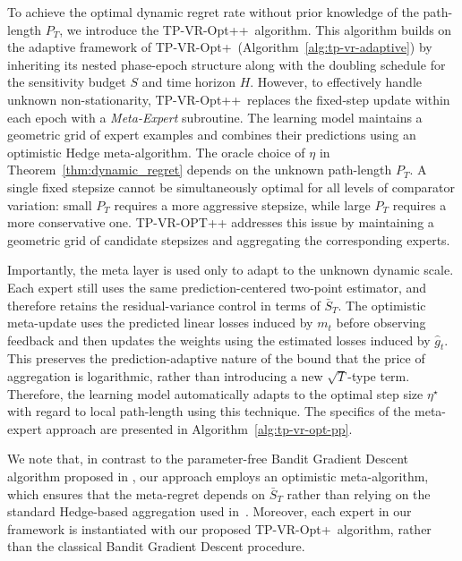 \documentclass[journal,onecolumn]{IEEEtran}
\theoremstyle{plain}
\theoremstyle{definition}
\theoremstyle{remark}
\newcommand{\tpvrplus}{{\sc TP-VR-Opt+}}
\newcommand{\tpvrplusplus}{{\sc TP-VR-Opt++}}
\begin{document}
To achieve the optimal dynamic regret rate without prior knowledge of the path-length
$P_{T}$, we introduce the \tpvrplusplus\, algorithm. This algorithm builds on the
adaptive framework of \tpvrplus\, (Algorithm~\ref{alg:tp-vr-adaptive}) by
inheriting its nested phase-epoch structure along with the doubling schedule for
the sensitivity budget $S$ and time horizon $H$. However, to effectively handle
unknown non-stationarity, \tpvrplusplus\, replaces the fixed-step update within
each epoch with a \emph{Meta-Expert} subroutine. The learning model maintains a
geometric grid of expert examples and combines their predictions using an
optimistic Hedge meta-algorithm. The oracle choice of $\eta$ in Theorem~\ref{thm:dynamic_regret}
depends on the unknown path-length $P_T$. A single fixed stepsize cannot be
simultaneously optimal for all levels of comparator variation: small $P_T$
requires a more aggressive stepsize, while large $P_T$ requires a more
conservative one. TP-VR-OPT++ addresses this issue by maintaining a geometric
grid of candidate stepsizes and aggregating the corresponding experts.

Importantly, the meta layer is used only to adapt to the unknown dynamic scale.
Each expert still uses the same prediction-centered two-point estimator, and
therefore retains the residual-variance control in terms of $\bar S_T$. The
optimistic meta-update uses the predicted linear losses induced by $m_t$ before
observing feedback and then updates the weights using the estimated losses
induced by $\widehat g_t$. This preserves the prediction-adaptive nature of the
bound that the price of aggregation is logarithmic, rather than introducing a new
$\sqrt{T}$-type term. Therefore, the learning model automatically adapts
to the optimal step size $\eta^{\star}$ with regard to local path-length using this
technique. The specifics of the meta-expert approach are presented in Algorithm~\ref{alg:tp-vr-opt-pp}.

We note that, in contrast to the parameter-free Bandit Gradient Descent algorithm proposed in \cite{zhao2021bandit}, our approach employs an optimistic meta-algorithm, which ensures that the meta-regret depends on $\bar S_T$ rather than relying on the standard Hedge-based aggregation used in~\cite{zhao2021bandit}. Moreover, each expert in our framework is instantiated with our proposed \tpvrplus\, algorithm, rather than the classical Bandit Gradient Descent procedure.
\end{document}
